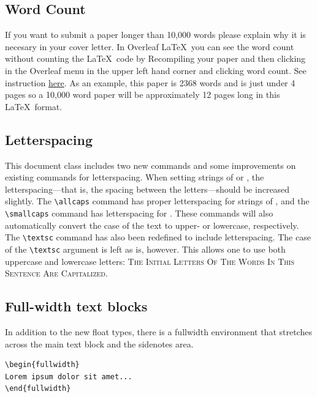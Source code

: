 \documentclass{tufte-handout}
\newcommand{\docenv}[1]{\textsf{#1}}%
\begin{document}
\subsection{Word Count}\label{sec:word-count} 
 If you want to submit a paper longer than 10,000 words please explain why it is necesary in your cover letter. In Overleaf \LaTeX\ you can see the word count without counting the \LaTeX\ code by Recompiling your paper and then clicking in the Overleaf menu in the upper left hand corner and clicking word count. See instruction \href{https://www.overleaf.com/learn/how-to/Is_there_a_way_to_run_a_word_count_that_doesn't_include_LaTeX_commands\%3F}{here}. As an example, this paper is 2368 words and is just under 4 pages so a 10,000 word paper will be approximately 12 pages long in this \LaTeX\ format.



\subsection{Letterspacing} \label{sec:letterspacing}
This document class includes two new commands and some improvements on existing commands for letterspacing. When setting strings of  or , the letter\-spacing---that is, the spacing between the letters---should be increased slightly.\cite{Bringhurst2005}  The \Verb|\allcaps| command has proper letterspacing for strings of , and the \Verb|\smallcaps| command has letterspacing for .  These commands will also automatically convert the case of the text to upper- or lowercase, respectively. The \Verb|\textsc| command has also been redefined to include letterspacing.  The case of the \Verb|\textsc| argument is left as is, however.  This allows one to use both uppercase and lowercase letters: \textsc{The Initial Letters Of The Words In This Sentence Are Capitalized.}


\subsection{Full-width text blocks}\label{sec:textblocks}

In addition to the new float types, there is a \docenv{fullwidth}
environment that stretches across the main text block and the sidenotes
area.

\begin{Verbatim}
\begin{fullwidth}
Lorem ipsum dolor sit amet...
\end{fullwidth}
\end{Verbatim}
\end{document}
